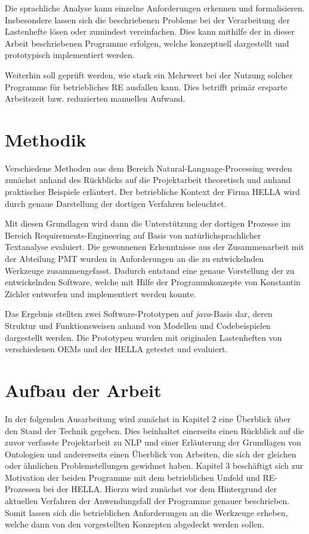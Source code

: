 \documentclass[12pt]{report}
\begin{document}
Die sprachliche Analyse kann einzelne Anforderungen erkennen und formalisieren. Insbesondere lassen sich die beschriebenen Probleme bei der Verarbeitung der Lastenhefte lösen oder zumindest vereinfachen. Dies kann mithilfe der in dieser Arbeit beschriebenen Programme erfolgen, welche konzeptuell dargestellt und prototypisch implementiert werden. 

Weiterhin soll geprüft werden, wie stark ein Mehrwert bei der Nutzung solcher Programme für betriebliches RE ausfallen kann. Dies betrifft primär ersparte Arbeitszeit bzw. reduzierten manuellen Aufwand.

\section{Methodik}
Verschiedene Methoden aus dem Bereich Natural-Language-Processing werden zunächst anhand des Rückblicks auf die Projektarbeit theoretisch und anhand praktischer Beispiele erläutert. Der betriebliche Kontext der Firma HELLA wird durch genaue Darstellung der dortigen Verfahren beleuchtet. 

Mit diesen Grundlagen wird dann die Unterstützung der dortigen Prozesse im Bereich Requirements-Engineering auf Basis von natürlichsprachlicher Textanalyse evaluiert. Die gewonnenen Erkenntnisse aus der Zusammenarbeit mit der Abteilung PMT wurden in Anforderungen an die zu entwickelnden Werkzeuge zusammengefasst. Dadurch entstand eine genaue Vorstellung der zu entwickelnden Software, welche mit Hilfe der Programmkonzepte von Konstantin Zichler \cite{zh19} entworfen und implementiert werden konnte. 

Das Ergebnis stellten zwei Software-Prototypen auf \textit{java}-Basis dar, deren Struktur und Funktionsweisen anhand von Modellen und Codebeispielen dargestellt werden. Die Prototypen wurden mit originalen Lastenheften von verschiedenen OEMs und der HELLA getestet und evaluiert.

\section{Aufbau der Arbeit}
In der folgenden Ausarbeitung wird zunächst in Kapitel 2 eine Überblick über den Stand der Technik gegeben. Dies beinhaltet einerseits einen Rückblick auf die zuvor verfasste Projektarbeit zu NLP und einer Erläuterung der Grundlagen von Ontologien und andererseits einen Überblick von Arbeiten, die sich der gleichen oder ähnlichen Problemstellungen gewidmet haben. 
Kapitel 3 beschäftigt sich zur Motivation der beiden Programme mit dem betrieblichen Umfeld und RE-Prozessen bei der HELLA. Hierzu wird zunächst vor dem Hintergrund der aktuellen Verfahren der Anwendungsfall der Programme genauer beschrieben. Somit lassen sich die betrieblichen Anforderungen an die Werkzeuge erheben, welche dann von den vorgestellten Konzepten abgedeckt werden sollen. 
\end{document}
